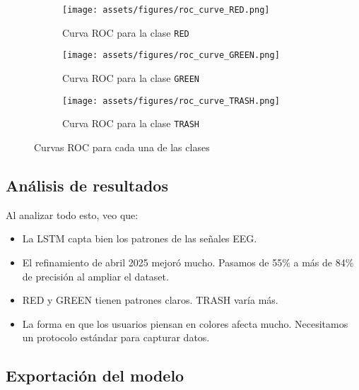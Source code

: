 \begin{figure}[ht]
    \centering
    \begin{subfigure}[b]{0.32\textwidth}
        \centering
        \texttt{[image: assets/figures/roc\_curve\_RED.png]}
        \caption{Curva ROC para la clase \texttt{RED}}
        \label{fig:roc_red}
    \end{subfigure}
    \hfill
    \begin{subfigure}[b]{0.32\textwidth}
        \centering
        \texttt{[image: assets/figures/roc\_curve\_GREEN.png]}
        \caption{Curva ROC para la clase \texttt{GREEN}}
        \label{fig:roc_green}
    \end{subfigure}
    \hfill
    \begin{subfigure}[b]{0.32\textwidth}
        \centering
        \texttt{[image: assets/figures/roc\_curve\_TRASH.png]}
        \caption{Curva ROC para la clase \texttt{TRASH}}
        \label{fig:roc_trash}
    \end{subfigure}
    \caption{Curvas ROC para cada una de las clases}
    \label{fig:roc_curves}
\end{figure}


\newpage
\subsection{Análisis de resultados}

Al analizar todo esto, veo que:

\begin{itemize}
    \item La LSTM capta bien los patrones de las señales EEG.
    
    \item El refinamiento de abril 2025 mejoró mucho. Pasamos de 55\% a más de 84\% de precisión al ampliar el dataset.
    
    \item RED y GREEN tienen patrones claros. TRASH varía más.
    
    \item La forma en que los usuarios piensan en colores afecta mucho. Necesitamos un protocolo estándar para capturar datos.
\end{itemize}

\subsection{Exportación del modelo}

